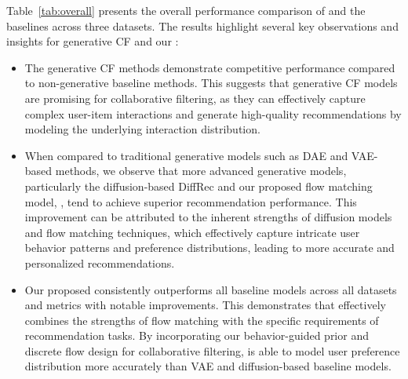 \documentclass[sigconf]{acmart}
\begin{document}
Table~\ref{tab:overall} presents the overall performance comparison of \ours and the baselines across three datasets. The results highlight several key observations and insights for generative CF and our \ours:
\begin{itemize}
[leftmargin=*,noitemsep,topsep=2pt]
	\item The generative CF methods demonstrate competitive performance compared to non-generative baseline methods. This suggests that generative CF models are promising for collaborative filtering, as they can effectively capture complex user-item interactions and generate high-quality recommendations by modeling the underlying interaction distribution.
	\item When compared to traditional generative models such as DAE and VAE-based methods, we observe that more advanced generative models, particularly the diffusion-based DiffRec and our proposed flow matching model, \ours, tend to achieve superior recommendation performance. This improvement can be attributed to the inherent strengths of diffusion models and flow matching techniques, which effectively capture intricate user behavior patterns and preference distributions, leading to more accurate and personalized recommendations.
	\item Our proposed \ours consistently outperforms all baseline models across all datasets and metrics with notable improvements. This demonstrates that \ours effectively combines the strengths of flow matching with the specific requirements of recommendation tasks. By incorporating our behavior-guided prior and discrete flow design for collaborative filtering, \ours is able to model user preference distribution more accurately than VAE and diffusion-based baseline models.
\end{itemize}
\end{document}
